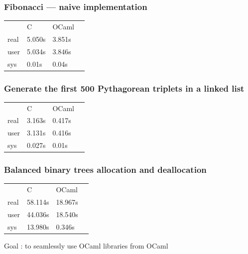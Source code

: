 \documentclass[aspectratio=169]{beamer}
\begin{document}
\begin{frame}
  \frametitle{Fibonacci --- naive implementation}
  \begin{table}
    \centering
    \begin{tabular}{llll}\label{tab:fibtab}
           & C      & OCaml  & \\
      real & 5.050s & 3.851s & \\
      user & 5.034s & 3.846s & \\
      sys  & 0.01s  & 0.04s  &
    \end{tabular}
  \end{table}
\end{frame}

\begin{frame}
  \frametitle{Generate the first 500 Pythagorean triplets in a linked list}
  \begin{table}
    \centering
    \begin{tabular}{llll}\label{tab:pythagtab}
           & C      & OCaml  & \\
      real & 3.163s & 0.417s & \\
      user & 3.131s & 0.416s & \\
      sys  & 0.027s & 0.01s  &
    \end{tabular}
  \end{table}
\end{frame}

\begin{frame}
  \frametitle{Balanced binary trees allocation and deallocation}
  \centering
  \begin{tabular}{llll}\label{tab:bintreetab}
         & C       & OCaml   & \\
    real & 58.114s & 18.967s & \\
    user & 44.036s & 18.540s & \\
    sys  & 13.980s & 0.346s  &
  \end{tabular}
\end{frame}

\begin{frame}
  Goal : to seamlessly use OCaml libraries from OCaml
\end{frame}
\end{document}
